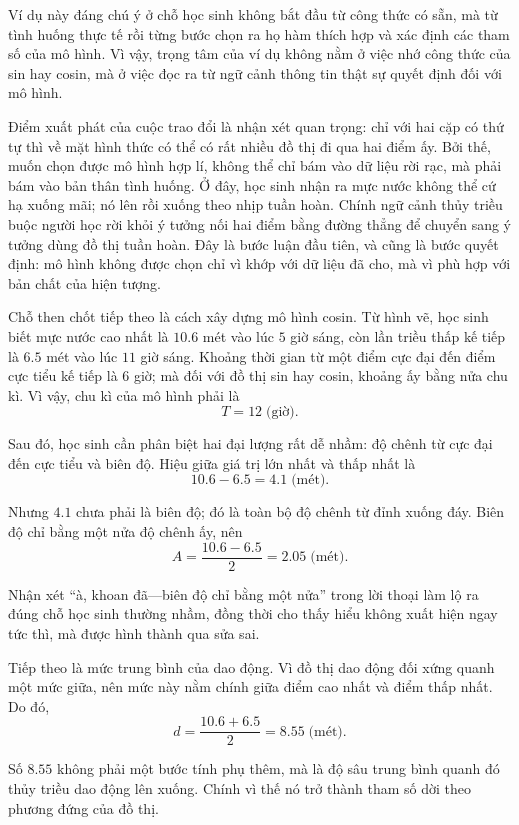   {
    Ví dụ này đáng chú ý ở chỗ học sinh không bắt đầu từ công thức có sẵn, mà từ tình huống thực tế rồi từng bước chọn ra họ hàm thích hợp và xác định các tham số của mô hình. Vì vậy, trọng tâm của ví dụ không nằm ở việc nhớ công thức của sin hay cosin, mà ở việc đọc ra từ ngữ cảnh thông tin thật sự quyết định đối với mô hình.

    Điểm xuất phát của cuộc trao đổi là nhận xét quan trọng: chỉ với hai cặp có thứ tự thì về mặt hình thức có thể có rất nhiều đồ thị đi qua hai điểm ấy. Bởi thế, muốn chọn được mô hình hợp lí, không thể chỉ bám vào dữ liệu rời rạc, mà phải bám vào bản thân tình huống. Ở đây, học sinh nhận ra mực nước không thể cứ hạ xuống mãi; nó lên rồi xuống theo nhịp tuần hoàn. Chính ngữ cảnh thủy triều buộc người học rời khỏi ý tưởng nối hai điểm bằng đường thẳng để chuyển sang ý tưởng dùng đồ thị tuần hoàn. Đây là bước luận đầu tiên, và cũng là bước quyết định: mô hình không được chọn chỉ vì khớp với dữ liệu đã cho, mà vì phù hợp với bản chất của hiện tượng.

    Chỗ then chốt tiếp theo là cách xây dựng mô hình cosin. Từ hình vẽ, học sinh biết mực nước cao nhất là $10.6$ mét vào lúc $5$ giờ sáng, còn lần triều thấp kế tiếp là $6.5$ mét vào lúc $11$ giờ sáng. Khoảng thời gian từ một điểm cực đại đến điểm cực tiểu kế tiếp là $6$ giờ; mà đối với đồ thị sin hay cosin, khoảng ấy bằng nửa chu kì. Vì vậy, chu kì của mô hình phải là
    $$
    T=12\; \text{(giờ)}.
    $$

    Sau đó, học sinh cần phân biệt hai đại lượng rất dễ nhầm: độ chênh từ cực đại đến cực tiểu và biên độ. Hiệu giữa giá trị lớn nhất và thấp nhất là
    $$
    10.6-6.5=4.1\; \text{(mét)}.
    $$

    Nhưng $4.1$ chưa phải là biên độ; đó là toàn bộ độ chênh từ đỉnh xuống đáy. Biên độ chỉ bằng một nửa độ chênh ấy, nên
    $$
    A=\frac{10.6-6.5}{2}=2.05\; \text{(mét)}.
    $$

    Nhận xét ``à, khoan đã---biên độ chỉ bằng một nửa'' trong lời thoại làm lộ ra đúng chỗ học sinh thường nhầm, đồng thời cho thấy hiểu không xuất hiện ngay tức thì, mà được hình thành qua sửa sai.

    Tiếp theo là mức trung bình của dao động. Vì đồ thị dao động đối xứng quanh một mức giữa, nên mức này nằm chính giữa điểm cao nhất và điểm thấp nhất. Do đó,
    $$
    d=\frac{10.6+6.5}{2}=8.55\; \text{(mét)}.
    $$

    Số $8.55$ không phải một bước tính phụ thêm, mà là độ sâu trung bình quanh đó thủy triều dao động lên xuống. Chính vì thế nó trở thành tham số dời theo phương đứng của đồ thị.

}
